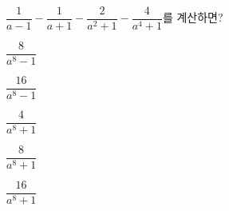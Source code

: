 $\dfrac{1}{a-1}-\dfrac{1}{a+1}-\dfrac{2}{a^2+1}-\dfrac{4}{a^4+1}$를 계산하면?
\begin{choices32}{\rule[-3ex]{0pt}{8ex}$\dfrac{8}{a^8-1}$}{\rule[-3ex]{0pt}{8ex}$\dfrac{16}{a^8-1}$}{\rule[-3ex]{0pt}{8ex}$\dfrac{4}{a^8+1}$}{\rule[-3ex]{0pt}{8ex}$\dfrac{8}{a^8+1}$}{\rule[-3ex]{0pt}{8ex}$\dfrac{16}{a^8+1}$}\end{choices32}
